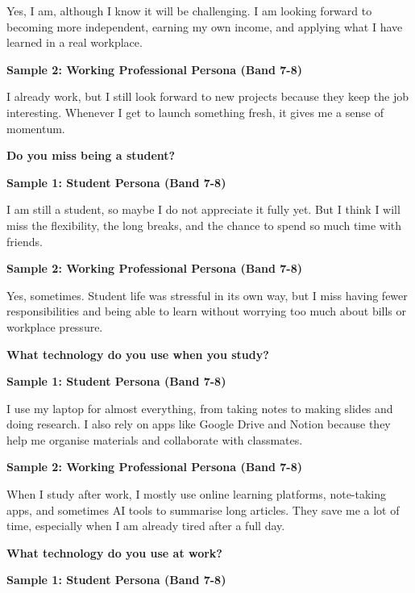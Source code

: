 Yes, I am, although I know it will be challenging. I am looking forward to becoming more independent, earning my own income, and applying what I have learned in a real workplace.

\textbf{Sample 2: Working Professional Persona (Band 7-8)}

I already work, but I still look forward to new projects because they keep the job interesting. Whenever I get to launch something fresh, it gives me a sense of momentum.

\separator

\begin{ieltsquestion}
\textbf{Do you miss being a student?}
\end{ieltsquestion}
\textbf{Sample 1: Student Persona (Band 7-8)}

I am still a student, so maybe I do not appreciate it fully yet. But I think I will miss the flexibility, the long breaks, and the chance to spend so much time with friends.

\textbf{Sample 2: Working Professional Persona (Band 7-8)}

Yes, sometimes. Student life was stressful in its own way, but I miss having fewer responsibilities and being able to learn without worrying too much about bills or workplace pressure.

\separator

\begin{ieltsquestion}
\textbf{What technology do you use when you study?}
\end{ieltsquestion}
\textbf{Sample 1: Student Persona (Band 7-8)}

I use my laptop for almost everything, from taking notes to making slides and doing research. I also rely on apps like Google Drive and Notion because they help me organise materials and collaborate with classmates.

\textbf{Sample 2: Working Professional Persona (Band 7-8)}

When I study after work, I mostly use online learning platforms, note-taking apps, and sometimes AI tools to summarise long articles. They save me a lot of time, especially when I am already tired after a full day.

\separator

\begin{ieltsquestion}
\textbf{What technology do you use at work?}
\end{ieltsquestion}
\textbf{Sample 1: Student Persona (Band 7-8)}

